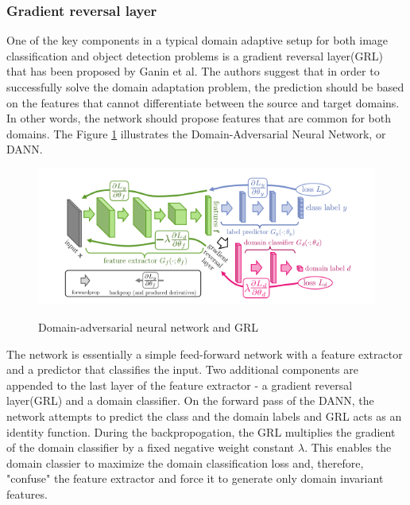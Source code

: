 \documentclass[english, 12pt, a4paper, elec, utf8, a-1b, online]{aaltothesis}
\begin{document}
\subsubsection{Gradient reversal layer}

One of the key components in a typical domain adaptive setup for both image classification and object detection problems is a gradient reversal layer(GRL) that has been proposed by Ganin et al\cite{Ganin2015}. The authors suggest that in order to successfully solve the domain adaptation problem, the prediction should be based on the features that cannot differentiate between the source and target domains. In other words, the network should propose features that are common for both domains. The Figure \ref{DANN} illustrates the Domain-Adversarial Neural Network, or DANN\cite{Ganin2015}. 

\begin{figure}[htb]
	\begin{center}
		\includegraphics[width=16cm]{./GRL.png}
	\end{center}
	\caption{Domain-adversarial neural network and GRL\cite{Ganin2015}}
	\begin{center}
		\label{DANN}
	\end{center}
\end{figure}
\FloatBarrier
The network is essentially a simple feed-forward network with a feature extractor and a predictor that classifies the input. Two additional components are appended to the last layer of the feature extractor - a gradient reversal layer(GRL) and a domain classifier. On the forward pass of the DANN, the network attempts to predict the class and the domain labels and GRL acts as an identity function. During the backpropogation, the GRL multiplies the gradient of the domain classifier by a fixed negative weight constant $\lambda$. This enables the domain classier to maximize the domain classification loss and, therefore, "confuse" the feature extractor and force it to generate only domain invariant features. \cite{Ganin2015} 
\end{document}
